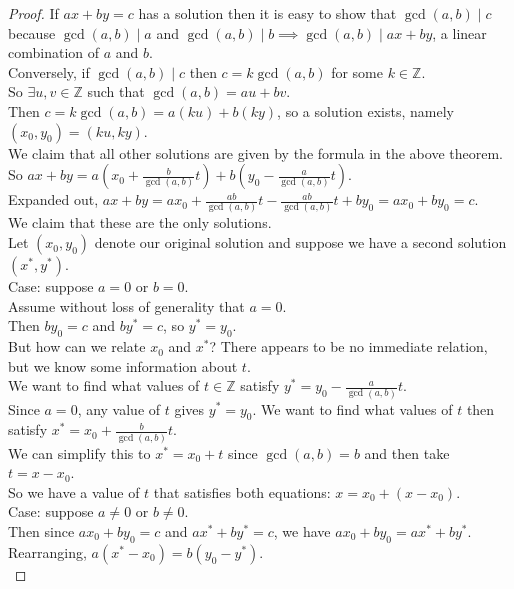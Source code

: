 \documentclass[11pt]{amsart}
\theoremstyle{definition}
\newcommand{\integers}{\mathbb{Z}}
\begin{document}
\begin{proof}
	If $ax + by = c$ has a solution then it is easy to show that $\gcd(a, b) \mid c$ because $\gcd(a, b) \mid a$ and $\gcd(a, b) \mid b \implies
	\gcd(a, b) \mid ax + by$, a linear combination of $a$ and $b$. \\
	Conversely, if $\gcd(a, b) \mid c$ then $c = k\gcd(a, b)$ for some $k \in \integers$. \\
	So $\exists u, v \in \integers$ such that $\gcd(a, b) = au + bv$. \\
	Then $c = k\gcd(a, b) = a(ku) + b(ky)$, so a solution exists, namely $(x_0, y_0) = (ku, ky)$. \\
	We claim that all other solutions are given by the formula in the above theorem. \\
	So $ax + by = a(x_0 + \frac{b}{\gcd(a, b)}t) + b(y_0 - \frac{a}{\gcd(a, b)}t)$. \\
	Expanded out, $ax + by = ax_0 + \frac{ab}{\gcd(a, b)}t - \frac{ab}{\gcd(a, b)}t + by_0 = ax_0 + by_0 = c$. \\
	We claim that these are the only solutions. \\
	Let $(x_0, y_0)$ denote our original solution and suppose we have a second solution $(x^*, y^*)$. \\
	Case: suppose $a = 0$ or $b = 0$. \\
	Assume without loss of generality that $a = 0$. \\
	Then $by_0 = c$ and $by^* = c$, so $y^* = y_0$. \\
	But how can we relate $x_0$ and $x^*$? There appears to be no immediate relation, but we know some information about $t$. \\
	We want to find what values of $t \in \integers$ satisfy $y^* = y_0 - \frac{a}{\gcd(a, b)}t$. \\
	Since $a = 0$, any value of $t$ gives $y^* = y_0$.
	We want to find what values of $t$ then satisfy $x^* = x_0 + \frac{b}{\gcd(a, b)}t$. \\
	We can simplify this to $x^* = x_0 + t$ since $\gcd(a, b) = b$ and then take $t = x - x_0$. \\
	So we have a value of $t$ that satisfies both equations: $x = x_0 + (x - x_0)$. \\
	Case: suppose $a \neq 0$ or $b \neq 0$. \\
	Then since $ax_0 + by_0 = c$ and $ax^* + by^* = c$, we have $ax_0 + by_0 = ax^* + by^*$. \\
	Rearranging, $a(x^* - x_0) = b(y_0 - y^*)$. \\

\end{proof}
\end{document}
